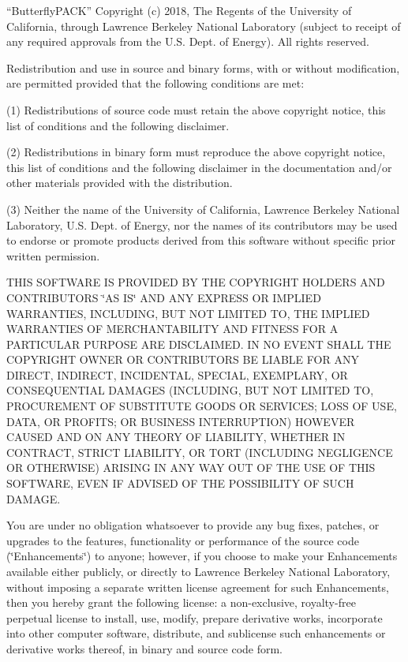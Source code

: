 “\+Butterfly\+PACK” Copyright (c) 2018, The Regents of the University of California, through Lawrence Berkeley National Laboratory (subject to receipt of any required approvals from the U.\+S. Dept. of Energy). All rights reserved.

Redistribution and use in source and binary forms, with or without modification, are permitted provided that the following conditions are met\+:

(1) Redistributions of source code must retain the above copyright notice, this list of conditions and the following disclaimer.

(2) Redistributions in binary form must reproduce the above copyright notice, this list of conditions and the following disclaimer in the documentation and/or other materials provided with the distribution.

(3) Neither the name of the University of California, Lawrence Berkeley National Laboratory, U.\+S. Dept. of Energy, nor the names of its contributors may be used to endorse or promote products derived from this software without specific prior written permission.

THIS SOFTWARE IS PROVIDED BY THE COPYRIGHT HOLDERS AND CONTRIBUTORS \char`\"{}\+AS IS\char`\"{} AND ANY EXPRESS OR IMPLIED WARRANTIES, INCLUDING, BUT NOT LIMITED TO, THE IMPLIED WARRANTIES OF MERCHANTABILITY AND FITNESS FOR A PARTICULAR PURPOSE ARE DISCLAIMED. IN NO EVENT SHALL THE COPYRIGHT OWNER OR CONTRIBUTORS BE LIABLE FOR ANY DIRECT, INDIRECT, INCIDENTAL, SPECIAL, EXEMPLARY, OR CONSEQUENTIAL DAMAGES (INCLUDING, BUT NOT LIMITED TO, PROCUREMENT OF SUBSTITUTE GOODS OR SERVICES; LOSS OF USE, DATA, OR PROFITS; OR BUSINESS INTERRUPTION) HOWEVER CAUSED AND ON ANY THEORY OF LIABILITY, WHETHER IN CONTRACT, STRICT LIABILITY, OR TORT (INCLUDING NEGLIGENCE OR OTHERWISE) ARISING IN ANY WAY OUT OF THE USE OF THIS SOFTWARE, EVEN IF ADVISED OF THE POSSIBILITY OF SUCH DAMAGE.

You are under no obligation whatsoever to provide any bug fixes, patches, or upgrades to the features, functionality or performance of the source code (\char`\"{}\+Enhancements\char`\"{}) to anyone; however, if you choose to make your Enhancements available either publicly, or directly to Lawrence Berkeley National Laboratory, without imposing a separate written license agreement for such Enhancements, then you hereby grant the following license\+: a non-\/exclusive, royalty-\/free perpetual license to install, use, modify, prepare derivative works, incorporate into other computer software, distribute, and sublicense such enhancements or derivative works thereof, in binary and source code form.  